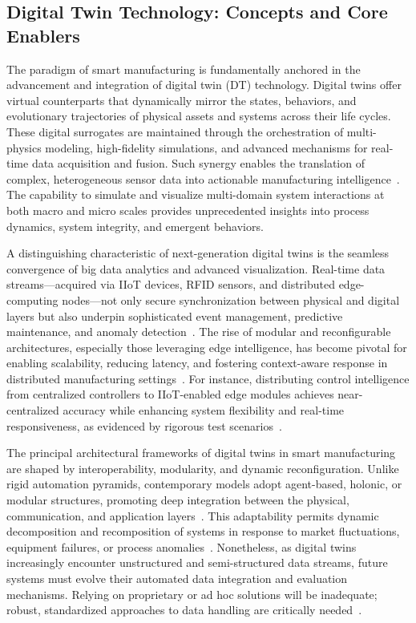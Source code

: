 \documentclass[sigconf]{acmart}
\begin{document}
\subsection{Digital Twin Technology: Concepts and Core Enablers}

The paradigm of smart manufacturing is fundamentally anchored in the advancement and integration of digital twin (DT) technology. Digital twins offer virtual counterparts that dynamically mirror the states, behaviors, and evolutionary trajectories of physical assets and systems across their life cycles. These digital surrogates are maintained through the orchestration of multi-physics modeling, high-fidelity simulations, and advanced mechanisms for real-time data acquisition and fusion. Such synergy enables the translation of complex, heterogeneous sensor data into actionable manufacturing intelligence~\cite{ref91}. The capability to simulate and visualize multi-domain system interactions at both macro and micro scales provides unprecedented insights into process dynamics, system integrity, and emergent behaviors.

A distinguishing characteristic of next-generation digital twins is the seamless convergence of big data analytics and advanced visualization. Real-time data streams---acquired via IIoT devices, RFID sensors, and distributed edge-computing nodes---not only secure synchronization between physical and digital layers but also underpin sophisticated event management, predictive maintenance, and anomaly detection~\cite{ref4,ref8,ref11,ref12,ref13,ref14,ref16,ref18,ref19,ref20,ref27,ref28,ref29,ref30,ref36,ref38,ref41,ref43,ref44,ref45,ref57,ref59,ref91}. The rise of modular and reconfigurable architectures, especially those leveraging edge intelligence, has become pivotal for enabling scalability, reducing latency, and fostering context-aware response in distributed manufacturing settings~\cite{ref91}. For instance, distributing control intelligence from centralized controllers to IIoT-enabled edge modules achieves near-centralized accuracy while enhancing system flexibility and real-time responsiveness, as evidenced by rigorous test scenarios~\cite{ref3}.

The principal architectural frameworks of digital twins in smart manufacturing are shaped by interoperability, modularity, and dynamic reconfiguration. Unlike rigid automation pyramids, contemporary models adopt agent-based, holonic, or modular structures, promoting deep integration between the physical, communication, and application layers~\cite{ref25}. This adaptability permits dynamic decomposition and recomposition of systems in response to market fluctuations, equipment failures, or process anomalies~\cite{ref3}. Nonetheless, as digital twins increasingly encounter unstructured and semi-structured data streams, future systems must evolve their automated data integration and evaluation mechanisms. Relying on proprietary or ad hoc solutions will be inadequate; robust, standardized approaches to data handling are critically needed~\cite{ref91}.
\end{document}
